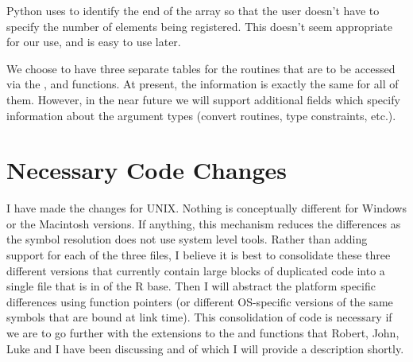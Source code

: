 \documentclass{article}
\begin{document}
Python uses \CNull{} to identify the end of the array so that the user
doesn't have to specify the number of elements being registered.  This
doesn't seem appropriate for our use, and is easy to use later.


We choose to have three separate tables for the routines that are to
be accessed via the ,  and
 functions.  At present, the information is
exactly the same for all of them. However, in the near future we will
support additional fields which specify information about the argument
types (convert routines, type constraints, etc.).

\section{Necessary Code Changes}

I have made the changes for UNIX. Nothing is conceptually different
for Windows or the Macintosh versions.  If anything, this mechanism
reduces the differences as the symbol resolution does not use system
level tools. Rather than adding support for each of the three
 files, I believe it is best to consolidate these
three different versions that currently contain large blocks of
duplicated code into a single file that is in  of the R
base. Then I will abstract the platform specific differences using
function pointers (or different OS-specific versions of the same
symbols that are bound at link time). This consolidation of code is
necessary if we are to go further with the extensions to the
 and  functions that Robert, John, Luke
and I have been discussing and of which I will provide a description
shortly.
\end{document}
